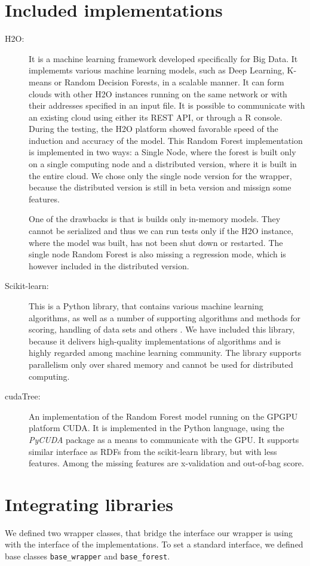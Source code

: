 \documentclass[thesis=B,english]{FITthesis}[2012/10/20]
\begin{document}
\section{Included implementations}
\begin{description}
\item[H2O:] It is a machine learning framework developed specifically for Big Data. It implememts various machine learning models, such as Deep Learning, K-means or Random Decision Forests, in a scalable manner. It can form clouds with other H2O instances running on the same network or with their addresses specified in an input file. It is possible to communicate with an existing cloud using either its REST API, or through a R console. During the testing, the H2O platform showed favorable speed of the induction and accuracy of the model. This Random Forest implementation is implemented in two ways: a Single Node, where the forest is built only on a single computing node and a distributed version, where it is built in the entire cloud. We chose only the single node version for the wrapper, because the distributed version is still in beta version and missign some features.

One of the drawbacks is that is builds only in-memory models. They cannot be serialized and thus we can run tests only if the H2O instance, where the model was built, has not been shut down or restarted. The single node Random Forest is also missing a regression mode, which is however included in the distributed version.
\item[Scikit-learn:] This is a Python library, that contains various machine learning algorithms, as well as a number of supporting algorithms and methods for scoring, handling of data sets and others \cite{scikit-learn}. We have included this library, because it delivers high-quality implementations of algorithms and is highly regarded among machine learning community. The library supports parallelism only over shared memory and cannot be used for distributed computing.
\item [cudaTree:] An implementation of the Random Forest model running on the GPGPU platform CUDA. It is implemented in the Python language, using the \textit{PyCUDA} package as a means to communicate with the GPU. It supports similar interface as RDFs from the scikit-learn library, but with less features. Among the missing features are x-validation and out-of-bag score.
\end{description}

\section{Integrating libraries}
We defined two wrapper classes, that bridge the interface our wrapper is using with the interface of the implementations. To set a standard interface, we defined base classes \texttt{base\_wrapper} and \texttt{base\_forest}. 
\end{document}
